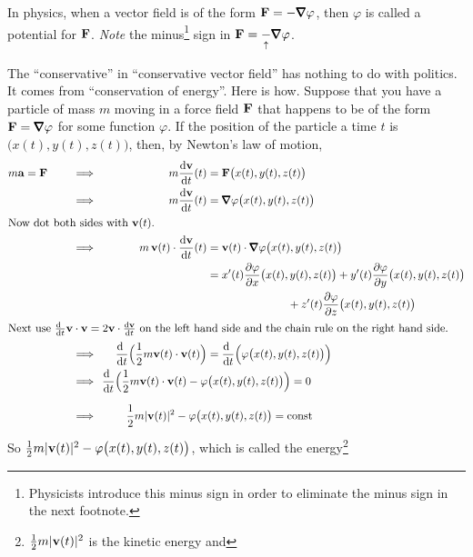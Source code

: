 \begin{warning}\label{warn:potential}
In physics,  when a vector field is of the form $\vF=-\vnabla\varphi$,
then $\varphi$ is called a potential for $\mathbf{F}$.
\emph{Note} the minus\footnote{Physicists introduce this minus sign in order to eliminate the minus sign in the next footnote.} sign in 
  $\vF=\underset{\uparrow}{-}\vnabla\varphi$. 
\end{warning}

\begin{eg}\label{eg:potentialEnergy}
The ``conservative'' in ``conservative vector field'' has nothing
to do with politics. It comes from ``conservation of energy''.
Here is how. Suppose that you have a particle of mass $m$ moving in
a force field $\mathbf{F}$ that happens to be of the form $\vF=\vnabla\varphi$
for some function $\varphi$. 
If the position of the particle a time $t$ is $\big(x(t),y(t),z(t)\big)$,
then, by Newton's law of motion,
\begin{alignat*}{3}
 m\va = \vF \qquad
&\implies & m\diff{\vv}{t}(t) &= \vF\big(x(t),y(t),z(t)\big) \\
&\implies & m\diff{\vv}{t}(t) &= \vnabla\varphi\big(x(t),y(t),z(t)\big)\\
\intertext{Now dot both sides with $\vv(t)$.} 
&\implies & m\,\vv(t)\cdot\diff{\vv}{t}(t) &= \vv(t)\cdot\vnabla\varphi\big(x(t),y(t),z(t)\big)  \\
& & &=x'(t)\frac{\partial\varphi}{\partial x}\big(x(t),y(t),z(t)\big)
+y'(t)\frac{\partial\varphi}{\partial y}\big(x(t),y(t),z(t)\big) \\
& & & \hskip1in
+z'(t)\frac{\partial\varphi}{\partial z}\big(x(t),y(t),z(t)\big)\\
\intertext{Next use $\diff{\ }{t}\vv\cdot\vv=2\vv\cdot\diff{\vv}{t}$
on the left hand side and the chain rule on the right hand side.}
&\implies &\ \ \diff{\ }{t}\Big(\frac{1}{2} m \vv(t)\cdot\vv(t)\Big) 
    &= \diff{\ }{t}\Big(\varphi\big(x(t),y(t),z(t)\big)\Big) \\
&\implies &  &\hskip-1.3in\diff{\ }{t}\Big(\frac{1}{2} m \vv(t)\cdot\vv(t) 
    -\varphi\big(x(t),y(t),z(t)\big)\Big) =0 \\[0.1in]
&\implies &  &\hskip-1.0in\frac{1}{2} m |\vv(t)|^2
    -\varphi\big(x(t),y(t),z(t)\big) = \text{const}
\end{alignat*}
So $\frac{1}{2} m |\mathbf{v}(t)|^2
    -\varphi\big(x(t),y(t),z(t)\big)$, which is called the 
energy\footnote{$\frac{1}{2} m |\mathbf{v}(t)|^2$ is the kinetic energy and
}
\end{eg}
